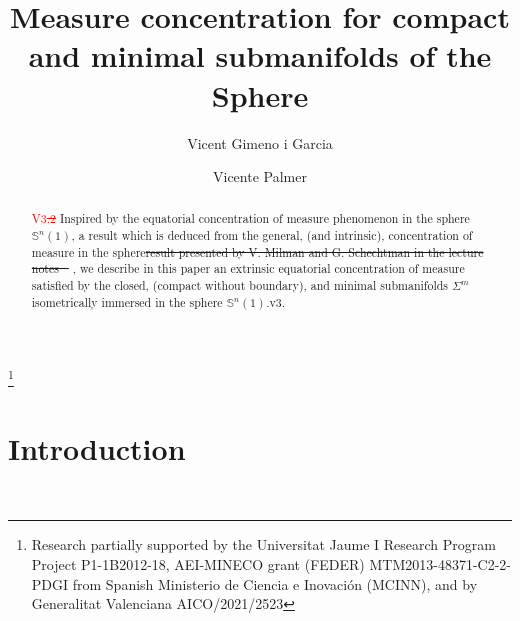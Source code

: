 \documentclass{amsart}
\theoremstyle{definition}
\theoremstyle{remark}
\newcommand{\ese}{\mathbb{S}}
\providecommand{\DIFadd}[1]{{\protect\color{blue}\uwave{#1}}} %
\providecommand{\DIFdel}[1]{{\protect\color{red}\sout{#1}}}                      %
\providecommand{\DIFaddbegin}{} %
\providecommand{\DIFaddend}{} %
\providecommand{\DIFdelbegin}{} %
\providecommand{\DIFdelend}{} %
\begin{document}
\title[Measure Concentration]{Measure concentration for compact and minimal submanifolds of the Sphere}





\author{Vicent Gimeno i Garcia}
\address{Department of Mathematics, Universitat Jaume I-IMAC,   E-12071, 
Castell\'{o}, Spain}
\author{Vicente Palmer}
\address{Department of Mathematics, Universitat Jaume I-INIT,   E-12071, 
Castell\'{o}, Spain}

\thanks{Research partially supported by  the Universitat Jaume I Research Program Project P1-1B2012-18, AEI-MINECO grant (FEDER) MTM2013-48371-C2-2-PDGI from Spanish Ministerio de Ciencia e Inovaci\'{o}n (MCINN), and by Generalitat Valenciana AICO/2021/2523}





\dedicatory{}



\begin{abstract}\textcolor{red}{V3\DIFdelbegin \DIFdel{.2}\DIFdelend \DIFaddbegin \DIFadd{.4}\DIFaddend }
Inspired by the equatorial concentration of measure phenomenon in the sphere $\ese^n(1)$, a result which is deduced from the general, (and intrinsic), concentration of measure in the sphere\DIFdelbegin \DIFdel{result presented by V. Milman and G. Schechtman in the lecture notes \mbox{%
\cite{MS}}\hskip0pt%
}\DIFdelend , we describe in this paper an extrinsic equatorial concentration of measure satisfied by the closed, (compact without boundary), and minimal submanifolds $\Sigma^m$ isometrically immersed in the sphere $\ese^n(1)$.v3.\end{abstract}

\maketitle

\section{Introduction}\label{sec:intro}\
\end{document}
